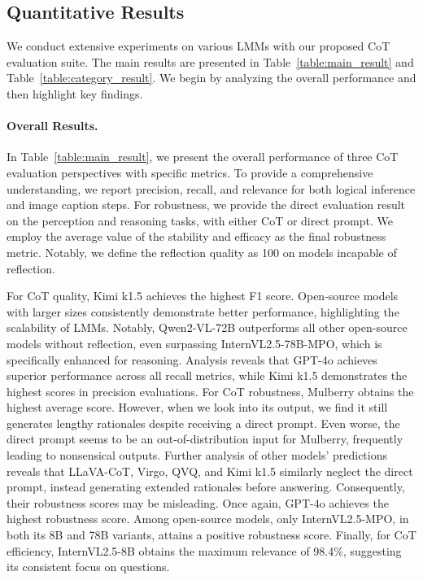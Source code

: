 \subsection{Quantitative Results}
\label{sec:exp_quantitative}
We conduct extensive experiments on various LMMs with our proposed CoT evaluation suite. 
The main results are presented in Table~\ref{table:main_result} and Table~\ref{table:category_result}. We begin by analyzing the overall performance and then highlight key findings.
\paragraph{Overall Results.}
In Table~\ref{table:main_result}, we present
the overall performance of three CoT evaluation perspectives with specific metrics. 
To provide a comprehensive understanding, we report precision, recall, and relevance for both logical inference and image caption steps. For robustness, we provide the direct evaluation result on the perception and reasoning tasks, with either CoT or direct prompt. We employ the average value of the stability and efficacy as the final robustness metric. Notably, we define the reflection quality as 100 on models incapable of reflection.

For CoT quality, Kimi k1.5 achieves the highest F1 score. Open-source models with larger sizes consistently demonstrate better performance, highlighting the scalability of LMMs. Notably, Qwen2-VL-72B outperforms all other open-source models without reflection, even surpassing InternVL2.5-78B-MPO, which is specifically enhanced for reasoning. Analysis reveals that GPT-4o achieves superior performance across all recall metrics, while Kimi k1.5 demonstrates the highest scores in precision evaluations.
For CoT robustness, Mulberry obtains the highest average score. However, when we look into its output, we find it still generates lengthy rationales despite receiving a direct prompt. Even worse, the direct prompt seems to be an out-of-distribution input for Mulberry, 
frequently leading to nonsensical outputs. Further analysis of other models’ predictions reveals that LLaVA-CoT, Virgo, QVQ, and Kimi k1.5 similarly neglect the direct prompt, instead generating extended rationales before answering. Consequently, their robustness scores may be misleading. Once again, GPT-4o achieves the highest robustness score. Among open-source models, only InternVL2.5-MPO, in both its 8B and 78B variants, attains a positive robustness score.
Finally, for CoT efficiency, InternVL2.5-8B obtains the maximum relevance of 98.4\%, suggesting its consistent focus on questions.

